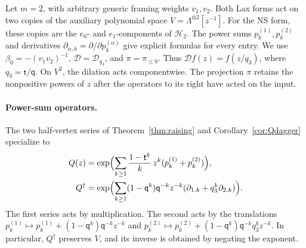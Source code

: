 \documentclass[11pt]{amsart}
\theoremstyle{definition}
\theoremstyle{remark}
\newcommand{\Mq}{\mathsf q}                      %
\newcommand{\Mt}{\mathsf t}                      %
\newcommand{\betaz}{\beta_0}                     %
\newcommand{\La}{\Lambda}                        %
\newcommand{\HH}{\mathcal H}
\newcommand{\Hsp}[1]{\HH_{#1}}                   %
\newcommand{\auxe}[1]{e_{#1}}                    %
\newcommand{\pk}[2]{p_{#1}^{(#2)}}               %
\newcommand{\DD}{\mathcal D}
\newcommand{\Twist}[1]{\DD_{#1}}                 %
\newcommand{\pile}{\pi_{\leq0}}                  %
\newcommand{\Qcr}{Q}                             %
\newcommand{\Qan}{Q^\dagger}                     %
\begin{document}
Let \(m=2\), with arbitrary generic framing weights \(v_1,v_2\).
Both Lax forms act on two copies of the auxiliary polynomial space
\(V=\La^{\otimes2}[z^{-1}]\). For the NS form, these copies are the
\(\auxe{0}\)- and \(\auxe{1}\)-components of \(\Hsp{2}\).
The power sums \(\pk{k}{1},\pk{k}{2}\) and derivatives
\(\partial_{\alpha,k}=\partial/\partial\pk{k}{\alpha}\) give explicit
formulas for every entry. We use \(\betaz=-(v_1v_2)^{-1}\),
\(\DD=\Twist{q_3}\), and \(\pi=\pile\). Thus
\(\DD f(z)=f(z/q_3)\), where \(q_3=\Mt/\Mq\).
On \(V^2\), the dilation acts componentwise.
The projection \(\pi\) retains the nonpositive powers of \(z\) after
the operators to its right have acted on the input.

\paragraph{Power-sum operators.}
The two half-vertex series of Theorem~\ref{thm:raising} and
Corollary~\ref{cor:Qdagger} specialize to
\begin{equation}\label{eq:ranktwohalves}
 \begin{aligned}
 \Qcr(z)&=\exp\Bigl(\sum_{k\geq1}\frac{1-\Mt^k}{k}\,
                   z^k(\pk{k}{1}+\pk{k}{2})\Bigr),\\
 \Qan&=\exp\Bigl(\sum_{k\geq1}(1-\Mq^k)\Mq^{-k}z^{-k}
                   (\partial_{1,k}+q_3^k\partial_{2,k})\Bigr).
 \end{aligned}
\end{equation}
The first series acts by multiplication. The second acts by the translations
\(\pk{k}{1}\mapsto\pk{k}{1}+(1-\Mq^k)\Mq^{-k}z^{-k}\) and
\(\pk{k}{2}\mapsto\pk{k}{2}+(1-\Mq^k)\Mq^{-k}q_3^kz^{-k}\).
In particular, \(\Qan\) preserves \(V\), and its inverse is obtained by
negating the exponent.
\end{document}

